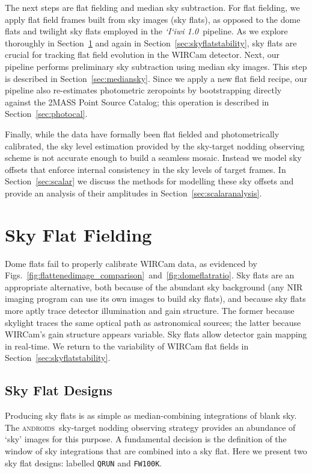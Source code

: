 \documentclass[iop]{emulateapj}
\newcommand{\sw}[1]{\textit{#1}} %
\newcommand{\iiwione}{\sw{`I`iwi 1.0}}
\newcommand{\androids}{\textsc{androids}}
\begin{document}
The next steps are flat fielding and median sky subtraction.
For flat fielding, we apply flat field frames built from sky images (sky flats), as opposed to the dome flats and twilight sky flats employed in the \iiwione\ pipeline.
As we explore thoroughly in Section~\ref{sec:flats} and again in Section~\ref{sec:skyflatstability}, sky flats are crucial for tracking flat field evolution in the WIRCam detector.
Next, our pipeline performs preliminary sky subtraction using median sky images.
This step is described in Section~\ref{sec:mediansky}.
Since we apply a new flat field recipe, our pipeline also re-estimates photometric zeropoints by bootstrapping directly against the 2MASS Point Source Catalog; this operation is described in Section~\ref{sec:photocal}.

Finally, while the data have formally been flat fielded and photometrically calibrated, the sky level estimation provided by the sky-target nodding observing scheme is not accurate enough to build a seamless mosaic.
Instead we model sky offsets that enforce internal consistency in the sky levels of target frames.
In Section~\ref{sec:scalar} we discuss the methods for modelling these sky offsets and provide an analysis of their amplitudes in  Section~\ref{sec:scalaranalysis}.

\section{Sky Flat Fielding}
\label{sec:flats}

Dome flats fail to properly calibrate WIRCam data, as evidenced by Figs.~\ref{fig:flattenedimage_comparison}~and~\ref{fig:domeflatratio}.
Sky flats are an appropriate alternative, both because of the abundant sky background (any NIR imaging program can use its own images to build sky flats), and because sky flats more aptly trace detector illumination and gain structure.
The former because skylight traces the same optical path as astronomical sources; the latter because WIRCam's gain structure appears variable.
Sky flats allow detector gain mapping in real-time.
We return to the variability of WIRCam flat fields in Section~\ref{sec:skyflatstability}.

\subsection{Sky Flat Designs}
\label{sec:flatdesign}

Producing sky flats is as simple as median-combining integrations of blank sky. 
The \androids\ sky-target nodding observing strategy provides an abundance of `sky' images for this purpose.
A fundamental decision is the definition of the window of sky integrations that are combined into a sky flat.
Here we present two sky flat designs: labelled \texttt{QRUN} and \texttt{FW100K}.
\end{document}
